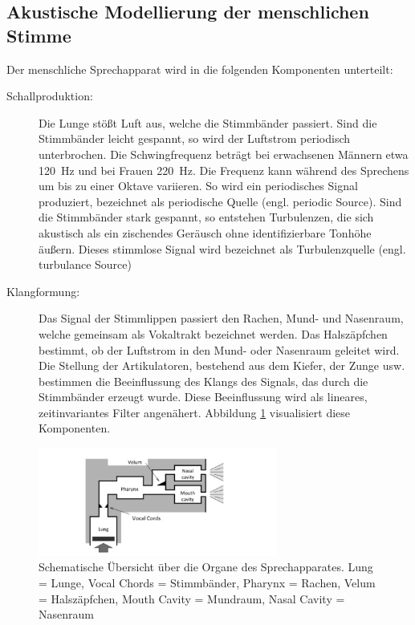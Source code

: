 \subsection{Akustische Modellierung der menschlichen Stimme}
\label{sec:theVoice}

Der menschliche Sprechapparat wird in die folgenden Komponenten unterteilt:

\begin{description}

\item[Schallproduktion: ] Die Lunge stößt Luft aus, welche die Stimmbänder passiert. Sind die Stimmbänder leicht gespannt, so wird der Luftstrom periodisch unterbrochen. Die Schwingfrequenz beträgt bei erwachsenen Männern etwa \SI{120}{\hertz} und bei Frauen \SI{220}{\hertz}. Die Frequenz kann während des Sprechens um bis zu einer Oktave variieren. So wird ein periodisches Signal produziert, bezeichnet als \glqq periodische Quelle\grqq{} (engl. \glqq periodic Source\grqq). Sind die Stimmbänder stark gespannt, so entstehen Turbulenzen, die sich akustisch als ein zischendes Geräusch ohne identifizierbare Tonhöhe äußern. Dieses stimmlose Signal wird bezeichnet als \glqq Turbulenzquelle\grqq{} (engl. \glqq turbulance Source\grqq)
\item[Klangformung: ] Das Signal der Stimmlippen passiert den Rachen, Mund- und Nasenraum, welche gemeinsam als \glqq Vokaltrakt\grqq{} bezeichnet werden. Das Halszäpfchen bestimmt, ob der Luftstrom in den Mund- oder Nasenraum geleitet wird. Die Stellung der Artikulatoren, bestehend aus dem Kiefer, der Zunge usw. bestimmen die Beeinflussung des Klangs des Signals, das durch die Stimmbänder erzeugt wurde. Diese Beeinflussung wird als lineares, zeitinvariantes Filter angenähert. \cite[S. 62]{cryModel} \cite[S. 13]{sprachverarbeitung} Abbildung \ref{img:schematicVocalOrgans} visualisiert diese Komponenten.
\end{description}

\begin{figure}[h]
	\centering
	\includegraphics[width=0.7\textwidth]{bilder/SchematicVocalOrgans.png}
	\caption[Schematische Übersicht über die Organe des Sprechapparates]{Schematische Übersicht über die Organe des Sprechapparates. Lung = Lunge, Vocal Chords = Stimmbänder, Pharynx = Rachen, Velum = Halszäpfchen, Mouth Cavity = Mundraum, Nasal Cavity = Nasenraum \cite{speechProduction}}
	\label{img:schematicVocalOrgans}
\end{figure}	

